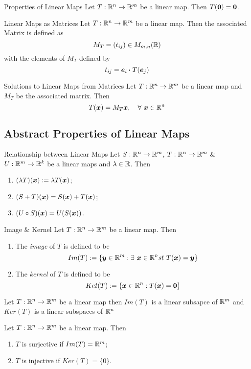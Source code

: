 \documentclass[11pt,a4paper]{article}
\begin{document}
\subtitle{Theorem 5.02 - }{Properties of Linear Maps}
Let $T : \mathbb{R}^n \to \mathbb{R}^m$ be a linear map. Then $T(\boldsymbol{0}) = \boldsymbol{0}$. \\

\subtitle{Definiton 5.03 - }{Linear Maps as Matrices}
Let $T : \mathbb{R}^n \to \mathbb{R}^m$ be a linear map. Then the associated Matrix is defined as $$M_T = (t_{ij}) \in M_{m,n}(\mathbb{R})$$
with the elements of $M_T$ defined by $$t_{ij} = \boldsymbol{e}_i \boldsymbol{\cdot} T(\boldsymbol{e}_j)$$

\subtitle{Theorem 5.04 - }{Solutions to Linear Maps from Matrices}
Let $T : \mathbb{R}^n \to \mathbb{R}^m$ be a linear map and $M_T$ be the associated matrix. Then $$T(\boldsymbol{x}) = M_T\boldsymbol{x},\quad \forall\ \boldsymbol{x} \in \mathbb{R}^n$$

\subsection{Abstract Properties of Linear Maps}
%
\subtitle{Theorem 5.05 - }{Relationship between Linear Maps}
Let $S : \mathbb{R}^n \to \mathbb{R}^m$, $T : \mathbb{R}^n \to \mathbb{R}^m$ \& $U : \mathbb{R}^m \to \mathbb{R}^k$ be a linear maps and $\lambda \in \mathbb{R}$. Then
\begin{enumerate}[label=\roman*)]
  \item $(\lambda T)(\boldsymbol{x}) := \lambda T(\boldsymbol{x})$;
  \item $(S + T)(\boldsymbol{x}) = S(\boldsymbol{x}) + T(\boldsymbol{x})$;
  \item $(U \circ S)(\boldsymbol{x}) = U(S(\boldsymbol{x}))$.
\end{enumerate}

\subtitle{Definition 5.06 - }{Image \& Kernel}
Let $T : \mathbb{R}^n \to \mathbb{R}^m$ be a linear map. Then
\begin{enumerate}[label=\roman*)]
  \item The \textit{image} of $T$ is defined to be $$Im(T) := \{\boldsymbol{y} \in \mathbb{R}^m : \exists\ \boldsymbol{x} \in \mathbb{R}^n st\ T(\boldsymbol{x}) = \boldsymbol{y}\}$$
  \item The \textit{kernel} of $T$ is defined to be $$Ket(T) := \{\boldsymbol{x} \in \mathbb{R}^n : T(\boldsymbol{x}) = \boldsymbol{0}\}$$
\end{enumerate}

\subtitle{Theorem 5.07}{}
Let $T : \mathbb{R}^n \to \mathbb{R}^m$ be a linear map then $Im(T)$ is a linear subsapce of $\mathbb{R}^m$ and $Ker(T)$ is a linear subspaces of $\mathbb{R}^n$ \\

\subtitle{Remark 5.08}{}
Let $T : \mathbb{R}^n \to \mathbb{R}^m$ be a linear map. Then
\begin{enumerate}[label=\roman*)]
  \item $T$ is surjective if $Im(T) = \mathbb{R}^m$;
  \item $T$ is injective if $Ker(T) = \{ 0\}$.
\end{enumerate}
\end{document}

